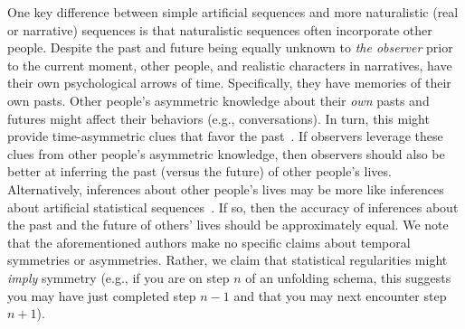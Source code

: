 \documentclass[10pt]{article}
\begin{document}
One key difference between simple artificial sequences and more naturalistic (real or narrative) sequences is that naturalistic sequences often incorporate other people. Despite the past and future being equally unknown to \textit{the observer} prior to the current moment, other people, and realistic characters in narratives, have their own psychological arrows of time. Specifically, they have memories of their own pasts. Other people's asymmetric knowledge about their \textit{own} pasts and futures might affect their behaviors (e.g., conversations). In turn, this might provide time-asymmetric clues that favor the past~\citep[e.g., other people might talk more about their own pasts than their futures; ][]{DemiEtal18}. If observers leverage these clues from other people's asymmetric knowledge, then observers should also be better at inferring the past (versus the future) of other people's lives. Alternatively, inferences about other people's lives may be more like inferences about artificial statistical sequences~\citep[e.g., perhaps solely relying on statistical regularities like event schemas, scripts, or situation models;][]{RadvCope06, ZwaaRadv98, BoweEtal79, RangRitc12, BaldEtal18}. If so, then the accuracy of inferences about the past and the future of others' lives should be approximately equal. We note that the aforementioned authors make no specific claims about temporal symmetries or asymmetries. Rather, we claim that statistical regularities might \textit{imply} symmetry (e.g., if you are on step $n$ of an unfolding schema, this suggests you may have just completed step $n - 1$ and that you may next encounter step $n + 1$).
\end{document}
